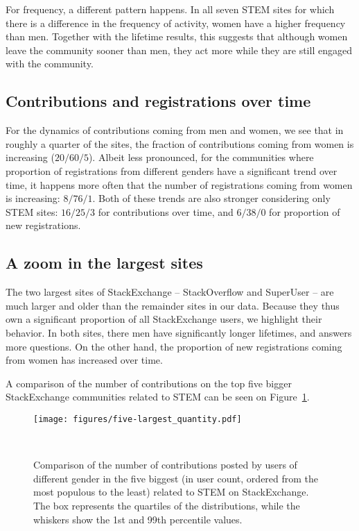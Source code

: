 For frequency, a different pattern happens. In all seven STEM sites for which there is a difference in the frequency of activity, women have a higher frequency than men. Together with the lifetime results, this suggests that although women leave the community sooner than men, they act more while they are still engaged with the community.


\subsection{Contributions and registrations over time}
For the dynamics of contributions coming from men and women, we see that in roughly a quarter of the sites, the fraction of contributions coming from women is increasing ($20/60/5$). Albeit less pronounced, for the communities where proportion of registrations from different genders have a significant trend over time, it happens more often that the number of registrations coming from women is increasing: $8/76/1$. Both of these trends are also stronger considering only STEM sites: $16/25/3$ for contributions over time, and $6/38/0$ for proportion of new registrations.





\subsection{A zoom in the largest sites} %
The two largest sites of StackExchange -- StackOverflow and SuperUser -- are much larger and older than the remainder sites in our data. Because they thus own a significant proportion of all StackExchange users, we highlight their behavior. In both sites, there men have significantly longer lifetimes, and answers more questions. On the other hand, the proportion of new registrations coming from women has increased over time. 

A comparison of  the number of contributions on the top five bigger StackExchange communities related to STEM can be seen on Figure~\ref{figure:top-five}.



\begin{figure}
  \texttt{[image: figures/five-largest\_quantity.pdf]}
  \caption{Comparison of the number of contributions posted by users of different gender in the five biggest (in user count, ordered from the most populous to the least) related to STEM on StackExchange. The box represents the quartiles of the distributions, while the whiskers show the 1st and 99th percentile values. }~\label{figure:top-five}
\end{figure}




